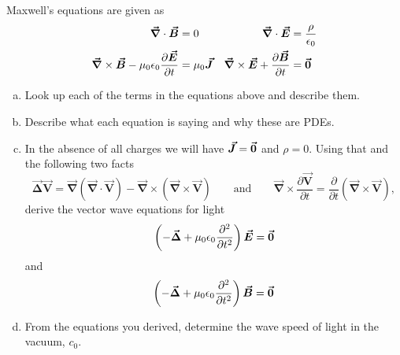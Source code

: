 \documentclass[12pt]{article} %
\newcommand{\vecfieldB}{\boldsymbol{\vec{B}}}
\newcommand{\vecfieldE}{\boldsymbol{\vec{E}}}
\newcommand{\vecfieldJ}{\boldsymbol{\vec{J}}}
\newcommand{\grad}{\boldsymbol{\vec{\nabla}}}
\newcommand{\veclaplace}{\boldsymbol{\vec{\Delta}}}
\newcommand{\vecfieldV}{\boldsymbol{\vec{V}}}
\begin{document}
\newpage
\begin{problem}
Maxwell's equations are given as
\begin{align*}
\grad \cdot \vecfieldB &= 0  & \grad \cdot \vecfieldE &= \frac{\rho}{\epsilon_0}\\
\grad \times \vecfieldB -\mu_0 \epsilon_0\frac{\partial \vecfieldE}{\partial t}&=\mu_0 \vecfieldJ & \grad \times \vecfieldE + \frac{\partial \vecfieldB}{\partial t} &= \zerovec
\end{align*}
\begin{enumerate}[(a)]
    \item Look up each of the terms in the equations above and describe them.
    \item Describe what each equation is saying and why these are PDEs.
    \item In the absence of all charges we will have $\vecfieldJ=\zerovec$ and $\rho=0$.  Using that and the following two facts
    \[
    \veclaplace \vecfieldV = \grad (\grad \cdot \vecfieldV) - \grad \times (\grad \times \vecfieldV) \qquad \textrm{and} \qquad \grad \times \frac{\partial \vecfieldV}{\partial t} = \frac{\partial}{\partial t} (\grad \times \vecfieldV),
    \]
    derive the vector wave equations for light
    \[
    \left( - \veclaplace + \mu_0 \epsilon_0 \frac{\partial^2 }{\partial t^2}\right) \vecfieldE = \zerovec
    \]
    and
    \[
    \left( - \veclaplace + \mu_0 \epsilon_0 \frac{\partial^2 }{\partial t^2}\right) \vecfieldB = \zerovec
    \]
    \item From the equations you derived, determine the wave speed of light in the vacuum, $c_0$.
\end{enumerate}
\end{problem}
\end{document}
